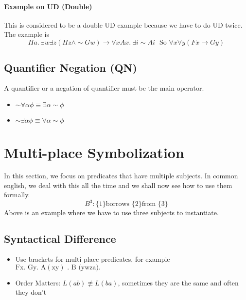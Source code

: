 \documentclass[10pt]{article}
\renewcommand{\implies}{\rightarrow}
\renewcommand{\neg}{\sim}
\begin{document}
\paragraph{Example on UD (Double)}
This is considered to be a double UD example because we have to do UD twice. The example is
\begin{equation*}
    Ha.~\exists w \exists z (Hz \land \neg Gw) \implies \forall x Ax.~\exists i \neg Ai \text{~~So~} \forall x \forall y (Fx \implies Gy)
\end{equation*}


\subsection{Quantifier Negation (QN)}
A quantifier or a negation of quantifier must be the main operator.
\begin{itemize}
    \item $\neg \forall \alpha \phi \equiv \exists \alpha \neg \phi$
    \item $\neg \exists \alpha \phi \equiv \forall \alpha \neg \phi$
\end{itemize}

\section{Multi-place Symbolization}
In this section, we focus on predicates that have multiple subjects. In common english, we deal with this all the time and we shall now see how to use them formally.
\begin{equation*}
    B^3:\text{\{1\} borrows \{2\} from \{3\}}
\end{equation*}
Above is an example where we have to use three subjects to instantiate. 

\subsection{Syntactical Difference}
\begin{itemize}
    \item Use brackets for multi place predicates, for example $\mathrm{Fx} . \text { Gy. } \mathrm{A}(\mathrm{xy}) \text { . B (ywza). }$
    \item Order Matters: $L(ab)\not \equiv L(ba)$, sometimes they are the same and often they don't
\end{itemize}
\end{document}
